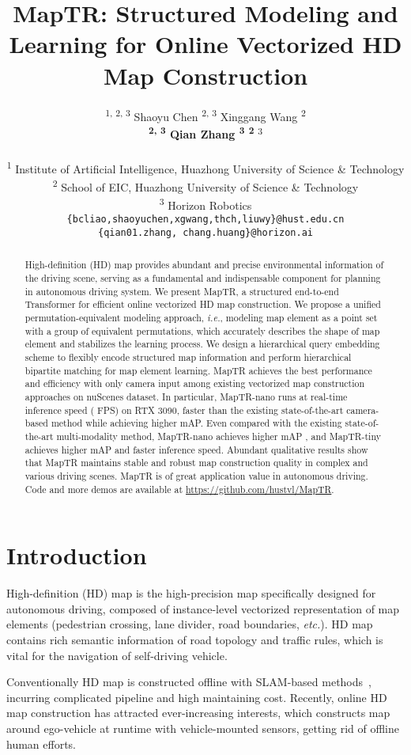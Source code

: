 \documentclass{article} \usepackage{iclr2023_conference,times}
\title{MapTR: Structured Modeling and Learning for Online Vectorized HD Map Construction}
\author{\quad\quad\quad{Bencheng Liao} \textsuperscript{1, 2, 3}\footnotemark[1] \quad
{Shaoyu Chen} \textsuperscript{2, 3} \footnotemark[1] \quad
 {Xinggang Wang} \textsuperscript{2} \footnotemark[2] \\
\textbf{\quad\quad\quad{Tianheng Cheng} \textsuperscript{2, 3}  \quad
{Qian Zhang} \textsuperscript{3} \quad {Wenyu Liu}\textsuperscript{2} \quad {Chang Huang}}\textsuperscript{3}
\\
\\
\quad\quad\quad \textsuperscript{1} Institute of Artificial Intelligence, Huazhong University of Science \& Technology \\
\quad\quad\quad \textsuperscript{2} School of EIC, Huazhong University of Science \& Technology \\
\quad\quad\quad \textsuperscript{3} Horizon Robotics \\
\texttt{\quad\quad\quad \{bcliao,shaoyuchen,xgwang,thch,liuwy\}@hust.edu.cn} \\
\texttt{\quad\quad\quad \{qian01.zhang, chang.huang\}@horizon.ai}
}
\def\ie{\emph{i.e.}} \def\Ie{\emph{I.e.}}
\def\etc{\emph{etc.}}
\begin{document}
\maketitle

\begin{abstract}
High-definition (HD) map provides abundant and precise environmental information of the driving scene, serving as a fundamental and indispensable component for planning in autonomous driving system.
We present MapTR, a structured end-to-end Transformer for efficient online vectorized HD map construction. We propose a unified permutation-equivalent modeling approach,
\ie, modeling map element as a point set with a group of equivalent permutations, which accurately describes the shape of map element and stabilizes the learning process. We design a hierarchical query embedding scheme to flexibly encode structured map information and perform hierarchical bipartite matching for map element learning. 
MapTR achieves the best performance and efficiency with only camera input among existing vectorized map construction approaches on nuScenes dataset. In particular, MapTR-nano runs at real-time inference speed ( FPS) on RTX 3090,  faster than the existing state-of-the-art camera-based method while achieving  higher mAP. Even compared with the existing state-of-the-art multi-modality method, MapTR-nano achieves  higher mAP 
, and MapTR-tiny achieves  higher mAP and  faster inference speed. Abundant qualitative results show that MapTR maintains stable and robust map construction quality in complex and various driving scenes. MapTR is of great application value in autonomous driving. Code and more demos are available at \url{https://github.com/hustvl/MapTR}.
\end{abstract}


\section{Introduction}
High-definition (HD)  map is the high-precision  map specifically designed for autonomous driving, composed of instance-level vectorized representation of  map elements (pedestrian crossing, lane divider, road boundaries, \etc). HD map contains rich semantic information of road topology and traffic rules, which is vital for the navigation of self-driving vehicle. 

Conventionally HD map is constructed offline with SLAM-based methods~\citep{loam,legoloam,liosam}, incurring complicated pipeline and high maintaining cost. Recently, online HD map construction has attracted ever-increasing interests, which constructs map around ego-vehicle at runtime with vehicle-mounted sensors, getting rid of offline human efforts.
\end{document}
